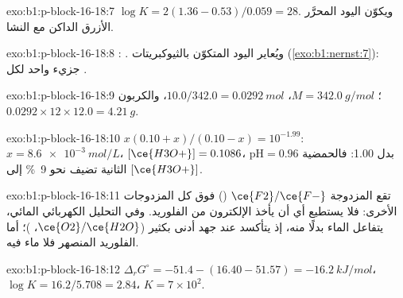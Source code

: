 \begin{solution}{exo:b1:p-block-16-18:7}
$\log K = 2(1.36 - 0.53)/0.059 = 28$. ويكوّن اليود المحرَّر  الأزرق
الداكن مع النشا.
\end{solution}

\begin{solution}{exo:b1:p-block-16-18:8}
: . ويُعاير اليود المتكوّن بالثيوكبريتات
(\cref{exo:b1:nernst:7}): جزيء  واحد لكل .
\end{solution}

\begin{solution}{exo:b1:p-block-16-18:9}
؛ $M = \qty{342.0}{g/mol}$، $10.0/342.0 =
\qty{0.0292}{mol}$، والكربون $0.0292 \times 12 \times 12.0 = \qty{4.21}{g}$.
\end{solution}

\begin{solution}{exo:b1:p-block-16-18:10}
$x(0.10 + x)/(0.10 - x) = 10^{-1.99}$: $x = \qty{8.6e-3}{mol/L}$،
$[\ce{H3O+}] = 0.1086$، $\mathrm{pH} = 0.96$ بدل 1.00: فالحمضية
الثانية تضيف نحو \qty{9}{\percent} إلى $[\ce{H3O+}]$.
\end{solution}

\begin{solution}{exo:b1:p-block-16-18:11}
تقع المزدوجة $\ce{F2}/\ce{F-}$ () فوق كل المزدوجات الأخرى: فلا يستطيع أي  أن يأخذ
الإلكترون من الفلوريد. وفي التحليل الكهربائي المائي، يتفاعل الماء بدلًا منه، إذ يتأكسد عند
جهد أدنى بكثير ($\ce{O2}/\ce{H2O}$، )؛ أما
الفلوريد المنصهر فلا ماء فيه.
\end{solution}

\begin{solution}{exo:b1:p-block-16-18:12}
$\Delta_r G^\circ = -51.4 - (16.40 - 51.57) = \qty{-16.2}{kJ/mol}$،
$\log K = 16.2/5.708 = 2.84$، $K = 7 \times 10^2$.
\end{solution}

